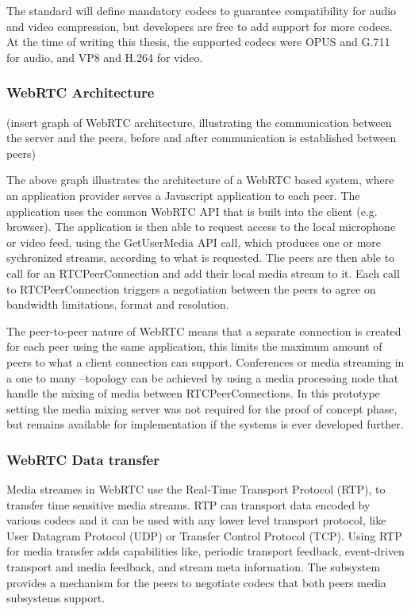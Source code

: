 \documentclass[english,12pt,a4paper,dvips]{article}
\begin{document}
The standard will define mandatory codecs to guarantee compatibility for audio and video compression, but developers are free to add support for more codecs. At the time of writing this thesis, the supported codecs were OPUS and G.711 for audio, and VP8 and H.264 for video. 
\cite{Jennings}

\subsubsection{WebRTC Architecture}

(insert graph of WebRTC architecture, illustrating the communication between the server and the peers, before and after communication is established between peers)

The above graph illustrates the architecture of a WebRTC based system, where an application provider serves a Javascript application to each peer. The application uses the common WebRTC API that is built into the client (e.g. browser). The application is then able to request access to the local microphone or video feed, using the GetUserMedia API call, which produces one or more sychronized streams, according to what is requested. The peers are then able to call for an RTCPeerConnection and add their local media stream to it. Each call to RTCPeerConnection triggers a negotiation between the peers to agree on bandwidth limitations, format and resolution. \cite{Jennings} 

The peer-to-peer nature of WebRTC means that a separate connection is created for each peer using the same application, this limits the maximum amount of peers to what a client connection can support. Conferences or media streaming in a one to many --topology can be achieved by using a media processing node that handle the mixing of media between RTCPeerConnections. \cite{Jennings} In this prototype setting the media mixing server was not required for the proof of concept phase, but remains available for implementation if the systems is ever developed further.

\subsubsection{WebRTC Data transfer}

Media streames in WebRTC use the Real-Time Transport Protocol (RTP), to transfer time sensitive media streams. RTP can transport data encoded by various codecs and it can be used with any lower level transport protocol, like User Datagram Protocol (UDP) or Transfer Control Protocol (TCP). Using RTP for media transfer adds capabilities like, periodic transport feedback, event-driven transport and media feedback, and stream meta information. The subsystem provides a mechanism for the peers to negotiate codecs that both peers media subsystems support. \cite{Jennings}
\end{document}
